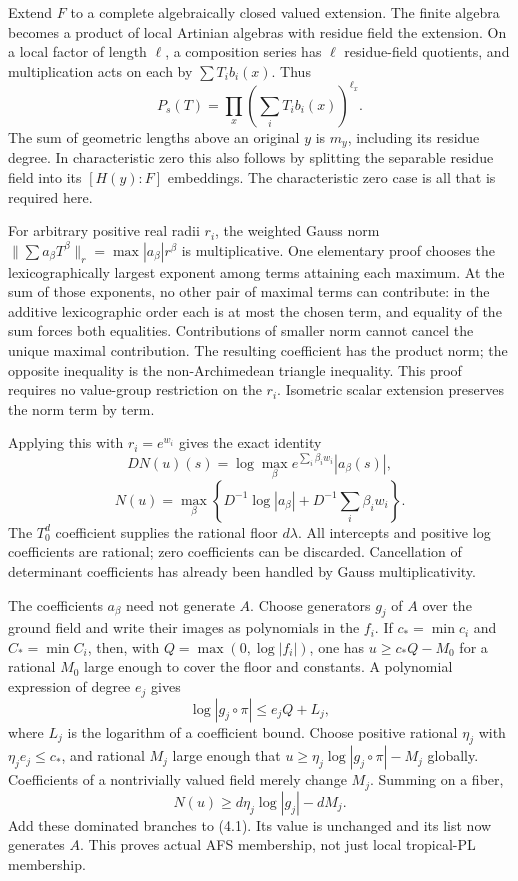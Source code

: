 \documentclass[
  10pt,
]{article}
\begin{document}
Extend \(F\) to a complete algebraically closed valued extension. The
finite algebra becomes a product of local Artinian algebras with residue
field the extension. On a local factor of length \(\ell\), a composition
series has \(\ell\) residue-field quotients, and multiplication acts on
each by \(\sum T_i b_i(x)\). Thus
\[P_s(T)=\prod_x\left(\sum_i T_i b_i(x)\right)^{\ell_x}.\] The sum of
geometric lengths above an original \(y\) is \(m_y\), including its
residue degree. In characteristic zero this also follows by splitting
the separable residue field into its \([H(y):F]\) embeddings. The
characteristic zero case is all that is required here.

For arbitrary positive real radii \(r_i\), the weighted Gauss norm
\(\|\sum a_\beta T^\beta\|_r=\max|a_\beta|r^\beta\) is multiplicative.
One elementary proof chooses the lexicographically largest exponent
among terms attaining each maximum. At the sum of those exponents, no
other pair of maximal terms can contribute: in the additive
lexicographic order each is at most the chosen term, and equality of the
sum forces both equalities. Contributions of smaller norm cannot cancel
the unique maximal contribution. The resulting coefficient has the
product norm; the opposite inequality is the non-Archimedean triangle
inequality. This proof requires no value-group restriction on the
\(r_i\). Isometric scalar extension preserves the norm term by term.

Applying this with \(r_i=e^{w_i}\) gives the exact identity
\[DN(u)(s)=\log\max_\beta e^{\sum_i\beta_iw_i}|a_\beta(s)|,\]
\[N(u)=\max_\beta\left\{D^{-1}\log|a_\beta|
                         +D^{-1}\sum_i\beta_iw_i\right\}.\tag{4.1}\] The
\(T_0^d\) coefficient supplies the rational floor \(d\lambda\). All
intercepts and positive log coefficients are rational; zero coefficients
can be discarded. Cancellation of determinant coefficients has already
been handled by Gauss multiplicativity.

The coefficients \(a_\beta\) need not generate \(A\). Choose generators
\(g_j\) of \(A\) over the ground field and write their images as
polynomials in the \(f_i\). If \(c_* =\min c_i\) and \(C_* =\min C_i\),
then, with \(Q=\max(0,\log|f_i|)\), one has \(u\ge c_* Q-M_0\) for a
rational \(M_0\) large enough to cover the floor and constants. A
polynomial expression of degree \(e_j\) gives
\[\log|g_j\circ\pi|\le e_j Q+L_j,\] where \(L_j\) is the logarithm of a
coefficient bound. Choose positive rational \(\eta_j\) with
\(\eta_je_j\le c_*\), and rational \(M_j\) large enough that
\(u\ge\eta_j\log|g_j\circ\pi|-M_j\) globally. Coefficients of a
nontrivially valued field merely change \(M_j\). Summing on a fiber,
\[N(u)\ge d\eta_j\log|g_j|-dM_j.\] Add these dominated branches to
(4.1). Its value is unchanged and its list now generates \(A\). This
proves actual AFS membership, not just local tropical-PL membership.
\end{document}
